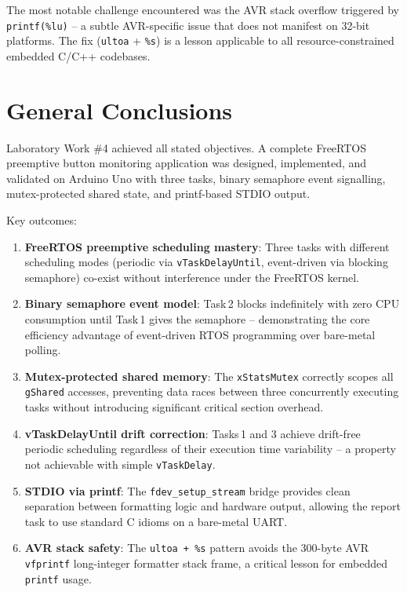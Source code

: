\documentclass[12pt]{article}
\begin{document}
The most notable challenge encountered was the AVR stack overflow triggered by \texttt{printf(\%lu)} -- a subtle AVR-specific issue that does not manifest on 32-bit platforms. The fix (\texttt{ultoa} + \texttt{\%s}) is a lesson applicable to all resource-constrained embedded C/C++ codebases.

\section*{General Conclusions}
\hspace{0.8cm} Laboratory Work \#4 achieved all stated objectives. A complete FreeRTOS preemptive button monitoring application was designed, implemented, and validated on Arduino Uno with three tasks, binary semaphore event signalling, mutex-protected shared state, and printf-based STDIO output.

Key outcomes:
\begin{enumerate}
    \item \textbf{FreeRTOS preemptive scheduling mastery}: Three tasks with different scheduling modes (periodic via \texttt{vTaskDelayUntil}, event-driven via blocking semaphore) co-exist without interference under the FreeRTOS kernel.
    \item \textbf{Binary semaphore event model}: Task\,2 blocks indefinitely with zero CPU consumption until Task\,1 gives the semaphore -- demonstrating the core efficiency advantage of event-driven RTOS programming over bare-metal polling.
    \item \textbf{Mutex-protected shared memory}: The \texttt{xStatsMutex} correctly scopes all \texttt{gShared} accesses, preventing data races between three concurrently executing tasks without introducing significant critical section overhead.
    \item \textbf{vTaskDelayUntil drift correction}: Tasks\,1 and 3 achieve drift-free periodic scheduling regardless of their execution time variability -- a property not achievable with simple \texttt{vTaskDelay}.
    \item \textbf{STDIO via printf}: The \texttt{fdev\_setup\_stream} bridge provides clean separation between formatting logic and hardware output, allowing the report task to use standard C idioms on a bare-metal UART.
    \item \textbf{AVR stack safety}: The \texttt{ultoa + \%s} pattern avoids the 300-byte AVR \texttt{vfprintf} long-integer formatter stack frame, a critical lesson for embedded \texttt{printf} usage.
\end{enumerate}
\end{document}
